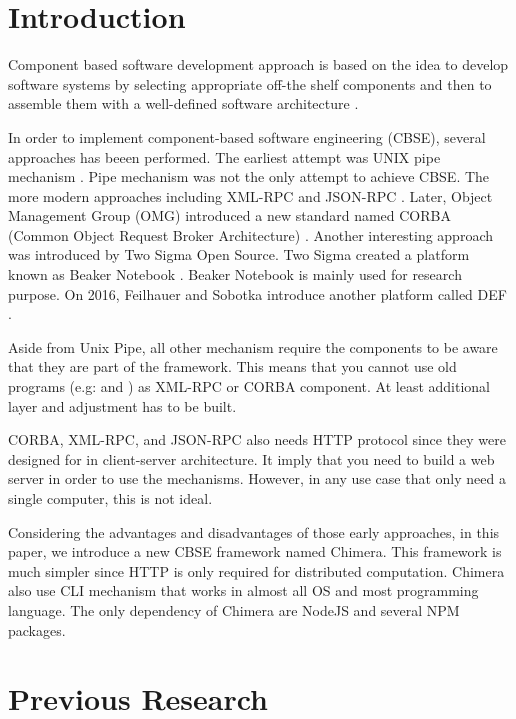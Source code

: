 \documentclass[conference]{IEEEtran}
\begin{document}
\IEEEpeerreviewmaketitle

\section{Introduction}

Component based software development approach is based on the idea to develop 
software systems by selecting appropriate off-the shelf components and then to 
assemble them with a well-defined software architecture \cite{kaur2010component}.

In order to implement component-based software engineering (CBSE), several 
approaches has beeen performed. The earliest attempt was UNIX pipe mechanism 
\cite{mcilroy1968mass}. Pipe mechanism was not the only attempt to achieve CBSE.
The more modern approaches including XML-RPC \cite{xmlrpc} and JSON-RPC \cite{jsonrpc}. 
Later, Object Management Group (OMG) introduced a new standard named CORBA (Common
Object Request Broker Architecture) \cite{corba}. Another interesting approach was 
introduced by Two Sigma Open Source. Two Sigma created a platform known as Beaker
Notebook \cite{beakernotebook}. Beaker Notebook is mainly used for research purpose. 
On 2016, Feilhauer and Sobotka introduce another platform called DEF 
\cite{feilhauer2016def}.

Aside from Unix Pipe, all other mechanism require the components to be aware that 
they are part of the framework. This means that you cannot use old programs (e.g:
 and ) as XML-RPC or CORBA component. At least additional layer
and adjustment has to be built.

CORBA, XML-RPC, and JSON-RPC also needs HTTP protocol since they were designed for 
in client-server architecture. It imply that you need to build a web server in order
to use the mechanisms. However, in any use case that only need a single computer,
this is not ideal.

Considering the advantages and disadvantages of those early approaches, in this paper, 
we introduce a new CBSE framework named Chimera. This framework is much simpler since
HTTP is only required for distributed computation. Chimera also use CLI mechanism that
works in almost all OS and most programming language.
The only dependency of Chimera are NodeJS and several NPM packages.

\section{Previous Research}
\end{document}
